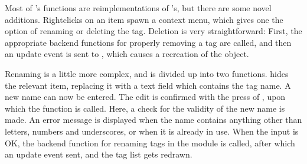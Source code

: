 Most of 's functions are reimplementations of
's, but there are some novel additions. Rightclicks on
an item spawn a context menu, which gives one the option of renaming or
deleting the tag. Deletion is very straightforward: First, the appropriate
backend functions for properly removing a tag are called, and then an update
event is sent to , which causes a recreation of the
 object.

Renaming is a little more complex, and is divided up into two functions.
 hides the relevant item, replacing it with a text field
which contains the tag name. A new name can now be entered. The edit is
confirmed with the press of , upon which the function
 is called. Here, a check for the validity of the new name is
made. An error message is displayed when the name contains anything other than
letters, numbers and underscores, or when it is already in use. When the input
is OK, the backend function for renaming tags in the  module is
called, after which an update event sent, and the tag list gets redrawn.
